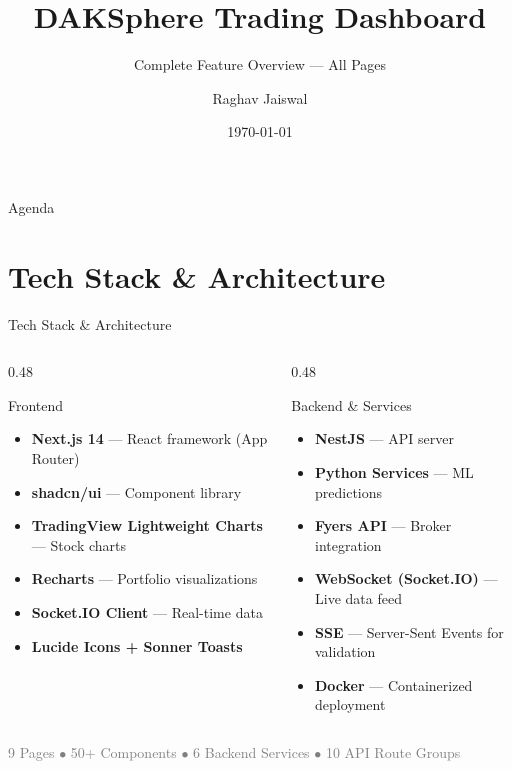 \documentclass[aspectratio=169, 11pt]{beamer}
\title[DAKSphere]{DAKSphere Trading Dashboard}
\subtitle{Complete Feature Overview — All Pages}
\author{Raghav Jaiswal}
\institute{APM Top-K Stocks}
\date{\today}
\begin{document}
\begin{frame}
\titlepage
\end{frame}

\begin{frame}{Agenda}
\tableofcontents
\end{frame}

\section{Tech Stack \& Architecture}
\begin{frame}{Tech Stack \& Architecture}
\begin{columns}[T]
\begin{column}{0.48\textwidth}
\begin{block}{Frontend}
\begin{itemize}
  \item \textbf{Next.js 14} — React framework (App Router)
  \item \textbf{shadcn/ui} — Component library
  \item \textbf{TradingView Lightweight Charts} — Stock charts
  \item \textbf{Recharts} — Portfolio visualizations
  \item \textbf{Socket.IO Client} — Real-time data
  \item \textbf{Lucide Icons + Sonner Toasts}
\end{itemize}
\end{block}
\end{column}
\begin{column}{0.48\textwidth}
\begin{block}{Backend \& Services}
\begin{itemize}
  \item \textbf{NestJS} — API server
  \item \textbf{Python Services} — ML predictions
  \item \textbf{Fyers API} — Broker integration
  \item \textbf{WebSocket (Socket.IO)} — Live data feed
  \item \textbf{SSE} — Server-Sent Events for validation
  \item \textbf{Docker} — Containerized deployment
\end{itemize}
\end{block}
\end{column}
\end{columns}
\vfill
\centering
\small\textcolor{gray}{9 Pages $\bullet$ 50+ Components $\bullet$ 6 Backend Services $\bullet$ 10 API Route Groups}
\end{frame}
\end{document}
